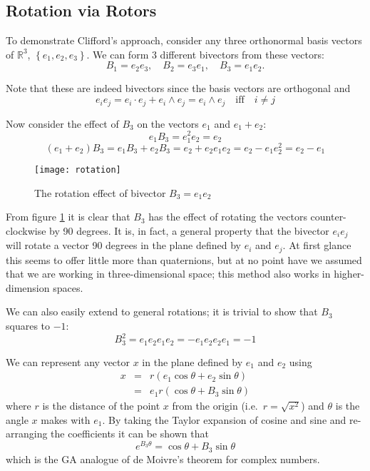 \subsection{Rotation via Rotors}

To demonstrate Clifford's approach, consider any three orthonormal basis
vectors of $\mathbb{R}^3$, $\left\{e_1, e_2, e_3\right\}$. We can form
3 different bivectors from these vectors:
\begin{displaymath}
B_1 = e_2e_3,\quad B_2 = e_3e_1,\quad B_3 = e_1e_2.
\end{displaymath}

Note that these are indeed bivectors since the basis vectors are orthogonal and
\[
e_ie_j = e_i \cdot e_j + e_i \wedge e_j = e_i \wedge e_j \quad \mbox{iff} \quad i \ne j
\]

Now consider the effect of $B_3$ on the vectors $e_1$ and $e_1 + e_2$:
\begin{displaymath}
e_1B_3 = e_1^2e_2=e_2 
\end{displaymath}
\begin{displaymath}
(e_1 + e_2)B_3 = e_1B_3 + e_2B_3 = e_2 + e_2e_1e_2 = e_2 - e_1e_2^2 = e_2 - e_1
\end{displaymath}

\begin{figure}
\centering
\texttt{[image: rotation]}
\caption{The rotation effect of bivector $B_3 = e_1e_2$\label{fig:rotation}}
\end{figure}

From figure \ref{fig:rotation} it is clear that $B_3$ has the effect
of rotating the vectors counter-clockwise by 90 degrees. It is, in fact, a
general property that the bivector $e_ie_j$ will rotate a vector 90 degrees in
the plane defined by $e_i$ and $e_j$. At first glance this seems to offer
little more than quaternions, but at no point have we assumed that we are
working in three-dimensional space; this method also works in higher-dimension
spaces.

We can also easily extend to general rotations; it is trivial to
show that $B_3$ squares to $-1$:
\begin{displaymath}
B_3^2 = e_1e_2e_1e_2 = -e_1e_2e_2e_1 = -1
\end{displaymath}

We can represent any vector $x$ in the plane defined by $e_1$ and
$e_2$ using
\begin{eqnarray*}
x & = & r ( e_1 \cos \theta + e_2 \sin \theta) \\
  & = & e_1 r ( \cos \theta + B_3 \sin \theta)
\end{eqnarray*}
where $r$ is the distance of the point $x$ from the origin (i.e.\ $r = \sqrt{x^2}$)
and $\theta$ is the angle $x$ makes with $e_1$. 
By taking the Taylor expansion of cosine
and sine and re-arranging the coefficients it can be shown that
\[
e^{B_3\theta} = \cos \theta + B_3 \sin \theta
\]
which is the GA analogue of de Moivre's theorem for complex
numbers.

